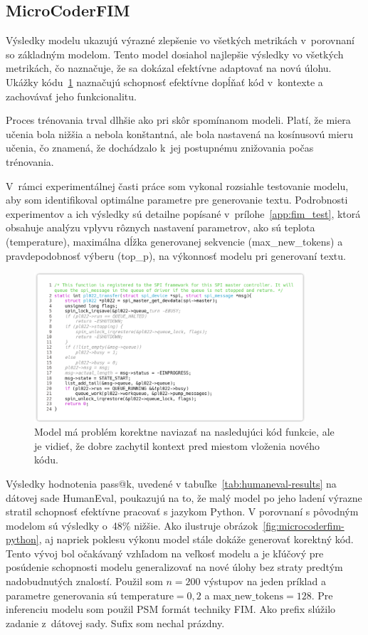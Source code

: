 \subsection{MicroCoderFIM}

Výsledky modelu \MCfim{} ukazujú výrazné zlepšenie vo všetkých metrikách v~porovnaní so základným modelom. Tento model dosiahol najlepšie výsledky vo všetkých metrikách, čo naznačuje, že sa dokázal efektívne adaptovať na novú úlohu. Ukážky kódu~\ref{code:MicroCoderFIM_1} naznačujú schopnosť efektívne dopĺňať kód v~kontexte a zachovávať jeho funkcionalitu.

Proces trénovania trval dlhšie ako pri skôr spomínanom modeli. Platí, že miera učenia bola nižšia a nebola konštantná, ale bola nastavená na kosínusovú mieru učenia, čo znamená, že dochádzalo k~jej postupnému znižovania počas trénovania.

V~rámci experimentálnej časti práce som vykonal rozsiahle testovanie modelu, aby som identifikoval optimálne parametre pre generovanie textu. Podrobnosti experimentov a ich výsledky sú detailne popísané v~prílohe~\ref{app:fim_test}, ktorá obsahuje analýzu vplyvu rôznych nastavení parametrov, ako sú teplota (temperature), maximálna dĺžka generovanej sekvencie (max\_new\_tokens) a pravdepodobnosť výberu (top\_p), na výkonnosť modelu pri generovaní textu.

\begin{figure}[H]
    \centering
    \includegraphics[width=0.9\textwidth]{obrazky/fim4.png}
    \caption{Model \MCfim{} má problém korektne naviazať na nasledujúci kód funkcie, ale je vidieť, že dobre zachytil kontext pred miestom vloženia nového kódu.}
    \label{code:MicroCoderFIM_1}
\end{figure}

Výsledky hodnotenia pass@k, uvedené v tabuľke~\ref{tab:humaneval-results} na dátovej sade HumanEval, poukazujú na to, že malý model po jeho ladení výrazne stratil schopnosť efektívne pracovať s jazykom Python. V porovnaní s pôvodným modelom \SC{} sú výsledky o~48\% nižšie. Ako ilustruje obrázok~\ref{fig:microcoderfim-python}, aj napriek poklesu výkonu model stále dokáže generovať korektný kód. Tento vývoj bol očakávaný vzhľadom na veľkosť modelu a je kľúčový pre posúdenie schopnosti modelu generalizovať na nové úlohy bez straty predtým nadobudnutých znalostí. Použil som $n=200$ výstupov na jeden príklad a parametre generovania sú $\text{temperature}=0,2$ a $\text{max\_new\_tokens}=128$. Pre inferenciu modelu som použil PSM formát techniky FIM. Ako prefix slúžilo zadanie z~dátovej sady. Sufix som nechal prázdny.

